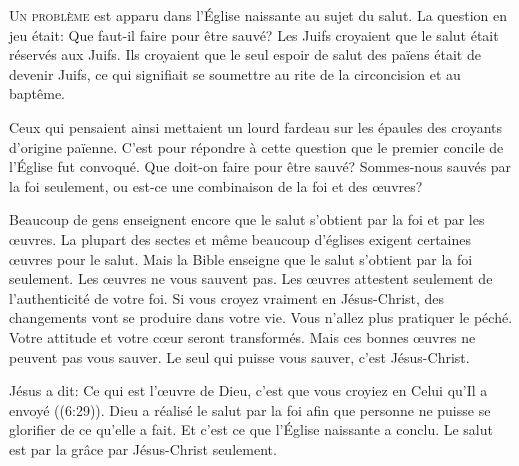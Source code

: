 


\lettrine{U}{n problème} est apparu dans l'Église  naissante
 au sujet du salut. La question en jeu était: 
 \Og Que faut-il faire pour être sauvé? \Fg{}
 Les Juifs croyaient que le salut était réservés aux Juifs.
 Ils croyaient que le seul espoir de salut des païens était de devenir Juifs,
 ce qui signifiait se soumettre au rite de la circoncision et au baptême.

Ceux qui pensaient ainsi mettaient un lourd fardeau sur les épaules
 des croyants d'origine païenne. C'est pour répondre à cette question
 que le premier concile de l'Église fut convoqué. 
 Que doit-on faire pour être sauvé? Sommes-nous sauvés par la foi seulement,
 ou est-ce une combinaison de la foi et des \oe{}uvres?


Beaucoup de gens enseignent encore que le salut s'obtient par la foi
 et par les \oe{}uvres. La plupart des sectes et même beaucoup d'églises
 exigent certaines \oe{}uvres pour le salut.
 Mais la Bible enseigne que le salut s'obtient par la foi seulement.
 Les \oe{}uvres ne vous sauvent pas. Les \oe{}uvres attestent seulement
 de l'authenticité de votre foi. Si vous croyez vraiment en Jésus-Christ,
 des changements vont se produire dans votre vie. Vous n'allez plus pratiquer
 le péché. Votre attitude et votre c\oe{}ur seront transformés.
 Mais ces bonnes \oe{}uvres ne peuvent pas vous sauver.
 Le seul qui puisse vous sauver, c'est Jésus-Christ.

Jésus a dit: 
 \Og Ce qui est l'\oe{}uvre de Dieu, c'est que vous croyiez en Celui
 qu'Il a envoyé \Fg{} ((6:29)).
 Dieu a réalisé le salut par la foi afin que personne ne puisse
 se glorifier de ce qu'elle a fait. Et c'est ce que l'Église 
 naissante a conclu. Le salut est par la grâce \ocadr par Jésus-Christ seulement.

\dvrule


